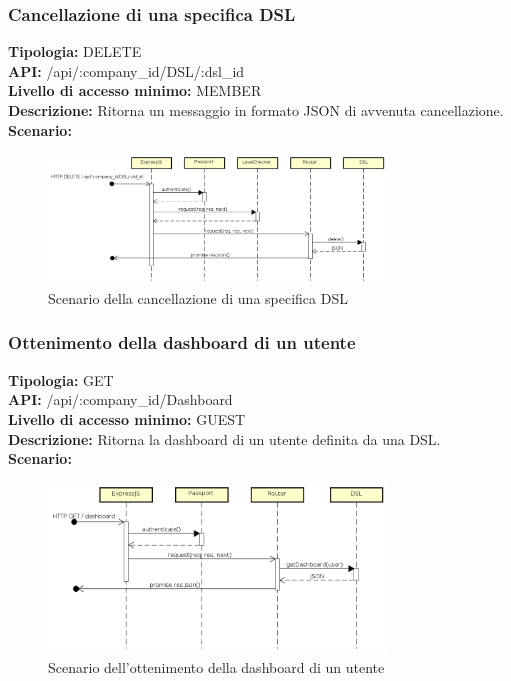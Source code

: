 \newpage
\subsubsection{Cancellazione di una specifica DSL}
\textbf{Tipologia:} DELETE \\
\textbf{API:} /api/:company\_id/DSL/:dsl\_id \\
\textbf{Livello di accesso minimo:} MEMBER \\
\textbf{Descrizione:} Ritorna un messaggio in formato JSON di avvenuta cancellazione. \\
\textbf{Scenario:} 
\begin{figure}[h]
\centering
\includegraphics[width=0.8\textwidth]{res/sections/backend/(DELETE)dsl.png}
\caption{Scenario della cancellazione di una specifica DSL}
\end{figure}

\newpage
\subsubsection{Ottenimento della dashboard di un utente}
\textbf{Tipologia:} GET \\
\textbf{API:} /api/:company\_id/Dashboard \\
\textbf{Livello di accesso minimo:} GUEST \\
\textbf{Descrizione:} Ritorna la dashboard di un utente definita da una DSL. \\
\textbf{Scenario:}  
\begin{figure}[h]
\centering
\includegraphics[width=0.8\textwidth]{res/sections/backend/(GET)dashboard.png}
\caption{Scenario dell'ottenimento della dashboard di un utente}
\end{figure}

